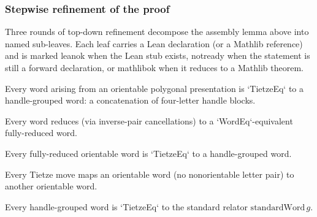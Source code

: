 \subsubsection*{Stepwise refinement of the proof}

Three rounds of top-down refinement decompose the assembly
lemma above into named sub-leaves.  Each leaf carries a Lean
declaration (or a Mathlib reference) and is marked
\textsf{leanok} when the Lean stub exists, \textsf{notready}
when the statement is still a forward declaration, or
\textsf{mathlibok} when it reduces to a Mathlib theorem.

\begin{lemma}
\label{lem:tietze-to-handle-grouped}
Every word arising from an orientable polygonal presentation is `TietzeEq` to a handle-grouped word: a concatenation of four-letter handle blocks.
\leanok
\end{lemma}

\begin{lemma}
\label{lem:tietze-cyclic-reduction}
Every word reduces (via inverse-pair cancellations) to a `WordEq`-equivalent fully-reduced word.
\leanok
\end{lemma}

\begin{lemma}
\label{lem:tietze-brahana}
Every fully-reduced orientable word is `TietzeEq` to a handle-grouped word.
\leanok
\end{lemma}

\begin{lemma}
\label{lem:tietze-moves-preserve-orientability}
Every Tietze move maps an orientable word (no nonorientable letter pair) to another orientable word.
\leanok
\end{lemma}

\begin{lemma}
\label{lem:tietze-handle-grouped-to-standard}
Every handle-grouped word is `TietzeEq` to the standard relator $\mathrm{standardWord}\,g$.
\leanok
\end{lemma}

